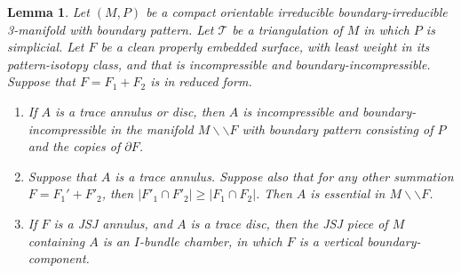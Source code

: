 \documentclass[oneside]{amsart}
\numberwithin{equation}{section}
\theoremstyle{plain}
\newtheorem{lemma}[equation]{Lemma}
\theoremstyle{definition}
\newcommand{\calT}{{\mathcal{T}}}
\newcommand{\cut}{\backslash\backslash}
\begin{document}
\begin{lemma}
\label{Lem:TraceAnnulusEssential}
Let $(M,P)$ be a compact orientable irreducible boundary-irreducible 3-manifold with boundary pattern. Let $\calT$ be a triangulation of $M$ in which $P$ is simplicial. Let $F$ be a clean properly embedded surface, with least weight in its  pattern-isotopy class, and that is incompressible and boundary-incompressible. Suppose that $F = F_1 + F_2$ is in reduced form.  
\begin{enumerate}
\item
If $A$ is a trace annulus or disc, then $A$ is incompressible and boundary-incompressible in the manifold $M \cut F$ with boundary pattern consisting of $P$ and the copies of $\partial F$.
\item
Suppose that $A$ is a trace annulus. Suppose also that for any other summation $F = F_1' + F'_2$, then $|F'_1 \cap F'_2| \geq |F_1 \cap F_2|$. Then $A$ is essential in $M \cut F$.
\item
If $F$ is a JSJ annulus, and $A$ is a trace disc, then the JSJ piece of $M$ containing $A$ is an $I$-bundle chamber, in which $F$ is a vertical boundary-component.
\end{enumerate}
\end{lemma}
\end{document}

